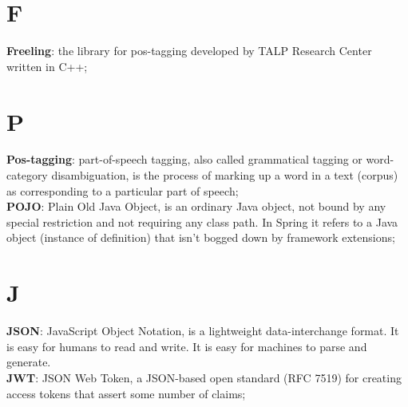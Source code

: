 
\section*{F}
\textbf{Freeling}: the library for pos-tagging developed by TALP Research Center written in C++;
\section*{P}
\textbf{Pos-tagging}: part-of-speech tagging, also called grammatical tagging or word-category disambiguation, is the process of marking up a word in a text (corpus) as corresponding to a particular part of speech; \\ 
\textbf{POJO}: Plain Old Java Object, is an ordinary Java object, not bound by any special restriction and not requiring any class path. In Spring it refers to a Java object (instance of definition) that isn't bogged down by framework extensions;
\section*{J}
\textbf{JSON}: JavaScript Object Notation, is a lightweight data-interchange format.  It is easy for humans to read and write. It is easy for machines to parse and generate.\\
\textbf{JWT}: JSON Web Token, a JSON-based open standard (RFC 7519) for creating access tokens that assert some number of claims;
